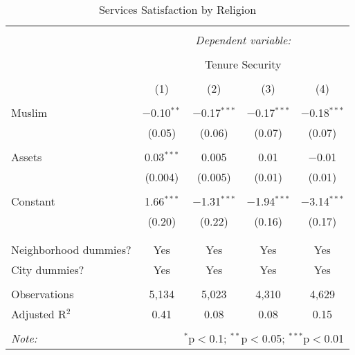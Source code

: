 
\begin{table}[!htbp] \centering 
  \caption{Services Satisfaction by Religion} 
  \label{table:Muslim_Services_2} 
\begin{tabular}{@{\extracolsep{5pt}}lcccc} 
\\[-1.8ex]\hline 
\hline \\[-1.8ex] 
 & \multicolumn{4}{c}{\textit{Dependent variable:}} \\ 
\cline{2-5} 
\\[-1.8ex] & \multicolumn{4}{c}{Tenure Security} \\ 
\\[-1.8ex] & (1) & (2) & (3) & (4)\\ 
\hline \\[-1.8ex] 
 Muslim & $-$0.10$^{**}$ & $-$0.17$^{***}$ & $-$0.17$^{***}$ & $-$0.18$^{***}$ \\ 
  & (0.05) & (0.06) & (0.07) & (0.07) \\ 
  & & & & \\ 
 Assets & 0.03$^{***}$ & 0.005 & 0.01 & $-$0.01 \\ 
  & (0.004) & (0.005) & (0.01) & (0.01) \\ 
  & & & & \\ 
 Constant & 1.66$^{***}$ & $-$1.31$^{***}$ & $-$1.94$^{***}$ & $-$3.14$^{***}$ \\ 
  & (0.20) & (0.22) & (0.16) & (0.17) \\ 
  & & & & \\ 
\hline \\[-1.8ex] 
Neighborhood dummies? & Yes & Yes & Yes & Yes \\ 
City dummies? & Yes & Yes & Yes & Yes \\ 
\hline \\[-1.8ex] 
Observations & 5,134 & 5,023 & 4,310 & 4,629 \\ 
Adjusted R$^{2}$ & 0.41 & 0.08 & 0.08 & 0.15 \\ 
\hline 
\hline \\[-1.8ex] 
\textit{Note:}  & \multicolumn{4}{r}{$^{*}$p$<$0.1; $^{**}$p$<$0.05; $^{***}$p$<$0.01} \\ 
\end{tabular} 
\end{table} 
